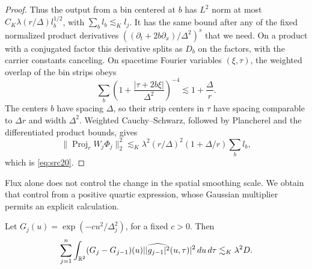 \begin{proof}
Thus the output from a bin centered at $b$ has $L^2$ norm at most
$C_K\lambda(r/\Delta)l_b^{1/2}$, with
$\sum_bl_b\lesssim_K l_j$.  It has the same bound after any of the
fixed normalized product derivatives
$((\partial_t+2b\partial_x)/\Delta^2)^s$ that we need.
On a product with a conjugated factor this derivative splits as
$D_b$ on the factors, with the carrier constants canceling.
On spacetime Fourier variables $(\xi,\tau)$, the weighted overlap
of the bin strips obeys
\[
 \sum_b\left(1+\frac{|\tau+2b\xi|}{\Delta^2}\right)^{-4}
 \lesssim1+\frac\Delta r.
\]
The centers $b$ have spacing $\Delta$, so their strip centers in
$\tau$ have spacing comparable to $\Delta r$ and width
$\Delta^2$.  Weighted Cauchy--Schwarz, followed by Plancherel and
the differentiated product bounds, gives
\[
 \|\operatorname{Proj}_rW_j\Phi_j\|_2^2
 \lesssim_K\lambda^2(r/\Delta)^2(1+\Delta/r)\sum_bl_b,
\]
which is \eqref{eq:src20}.
\end{proof}

Flux alone does not control the change in the spatial smoothing
scale.  We obtain that control from a positive quartic expression,
whose Gaussian multiplier permits an explicit calculation.

\begin{lemma}
\label{lem:frame-quartic}
Let $G_j(u)=\exp(-cu^2/\Delta_j^2)$, for a fixed $c>0$.
Then
\begin{equation}\label{eq:src22}
 \sum_{j=1}^n\int_{\mathbb R^2}(G_j-G_{j-1})(u)
       |\widehat{|g_{j-1}|^2}(u,\tau)|^2\,du\,d\tau
 \lesssim_K\lambda^2D.
\end{equation}
\end{lemma}

